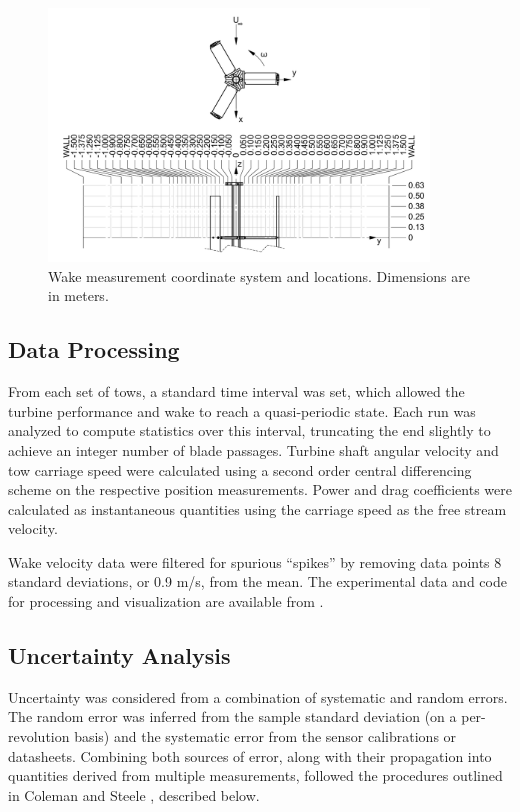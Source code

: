 \documentclass[energies,article,accept,moreauthors,pdftex,10pt,a4paper]{mdpi}
\theoremstyle{mdpi}
\newcounter{ex}
\newcounter{re}
\begin{document}
\begin{figure}[H]
\centering

\includegraphics[width=0.9\textwidth]{figures/turbine_coordinate_system}

\caption{Wake measurement coordinate system and locations. Dimensions are in
 meters.}

\label{fig:wake-locations}
\end{figure}


\subsection{Data Processing}

From each set of tows, a standard time interval was set, which allowed the
turbine performance and wake to reach a quasi-periodic state. Each run was
analyzed to compute statistics over this interval, truncating the end slightly
to achieve an integer number of blade passages. Turbine shaft angular velocity
and tow carriage speed were calculated using a second order central differencing
scheme on the respective position measurements. Power and drag coefficients were
calculated as instantaneous quantities using the carriage speed as the free
stream velocity.

Wake velocity data were filtered for spurious ``spikes'' by removing data points
8 standard deviations, or 0.9 m/s, from the mean. The experimental data and code
for processing and visualization are available from
\cite{Bachant2015-RVAT-Re-dep-data}.


\subsection{Uncertainty Analysis}

Uncertainty was considered from a combination of systematic and random errors.
The random error was inferred from the sample standard deviation (on a
per-revolution basis) and the systematic error from the sensor calibrations or
datasheets. Combining both sources of error, along with their propagation into
quantities derived from multiple measurements, followed the procedures outlined
in Coleman and Steele \cite{ColemanSteele}, described below.
\end{document}
